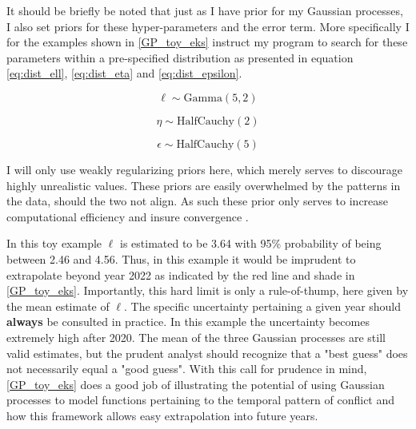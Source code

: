 \documentclass[a4paper]{article}
\begin{document}
It should be briefly be noted that just as I have prior for my Gaussian processes, I also set priors for these hyper-parameters and the error term. More specifically I for the examples shown in \autoref{GP_toy_eks} instruct my program to search for these parameters within a pre-specified distribution as presented in equation \ref{eq:dist_ell}, \ref{eq:dist_eta} and \ref{eq:dist_epsilon}.

\[
\ell \sim \text{Gamma}(5,2)  \tag{8}  \label{eq:dist_ell}
\]

\[
\eta \sim \text{HalfCauchy}(2)  \tag{9}  \label{eq:dist_eta}
\]

\[
\epsilon \sim \text{HalfCauchy}(5)  \tag{10}  \label{eq:dist_epsilon}
\]


I will only use weakly regularizing priors here, which merely serves to discourage highly unrealistic values. These priors are easily overwhelmed by the patterns in the data, should the two not align. As such these prior only serves to increase computational efficiency and insure convergence \citep[35-36]{Mcelreath_2018}.\par 


In this toy example $\ell$ is estimated to be 3.64 with 95\% probability of being between 2.46 and 4.56. Thus, in this example it would be imprudent to extrapolate beyond year 2022 as indicated by the red line and shade in \autoref{GP_toy_eks}. Importantly, this hard limit is only a rule-of-thump, here given by the mean estimate of $\ell$. The specific uncertainty pertaining a given year should \textbf{always} be consulted in practice. In this example the uncertainty becomes extremely high after 2020. The mean of the three Gaussian processes are still valid estimates, but the prudent analyst should recognize that a "best guess" does not necessarily equal a "good guess". With this call for prudence in mind, \autoref{GP_toy_eks} does a good job of illustrating the potential of using Gaussian processes to model functions pertaining to the temporal pattern of conflict and how this framework allows easy extrapolation into future years.\par
\end{document}
